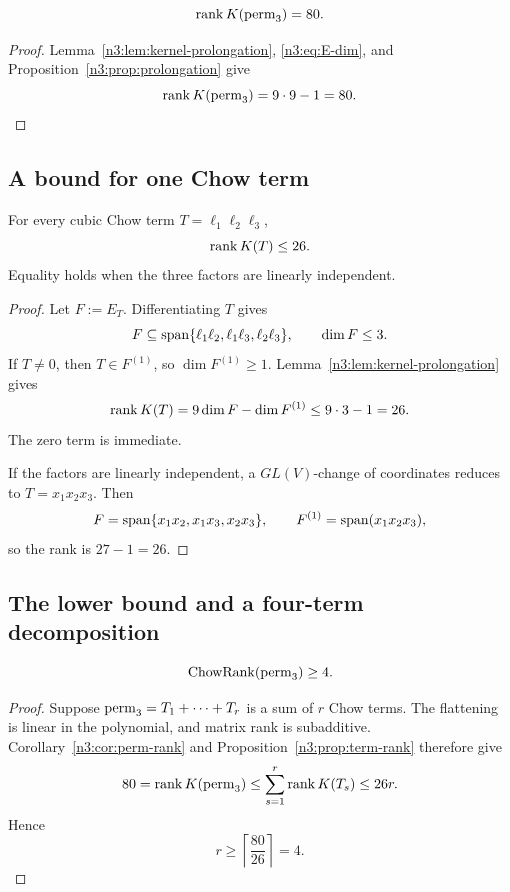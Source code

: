 \begin{corollary}\label{n3:cor:perm-rank}
\[
  \operatorname{rank} K(\operatorname{perm}_3)=80.
\]
\end{corollary}

\begin{proof}
Lemma~\ref{n3:lem:kernel-prolongation}, \eqref{n3:eq:E-dim}, and
Proposition~\ref{n3:prop:prolongation} give
\[
  \operatorname{rank} K(\operatorname{perm}_3)=9\cdot9-1=80.
\]
\end{proof}

\subsection{A bound for one Chow term}

\begin{proposition}\label{n3:prop:term-rank}
For every cubic Chow term \(T=\ell_1\ell_2\ell_3\),
\[
  \operatorname{rank} K(T)\leq26.
\]
Equality holds when the three factors are linearly independent.
\end{proposition}

\begin{proof}
Let \(F:=E_T\). Differentiating \(T\) gives
\[
  F\subseteq\operatorname{span}\{\ell_1\ell_2,\ell_1\ell_3,\ell_2\ell_3\},
  \qquad \dim F\leq3.
\]
If \(T\neq0\), then \(T\in F^{(1)}\), so \(\dim F^{(1)}\geq1\).
Lemma~\ref{n3:lem:kernel-prolongation} gives
\[
  \operatorname{rank} K(T)=9\dim F-\dim F^{(1)}\leq9\cdot3-1=26.
\]
The zero term is immediate.

If the factors are linearly independent, a \(GL(V)\)-change of coordinates
reduces to \(T=x_1x_2x_3\). Then
\[
  F=\operatorname{span}\{x_1x_2,x_1x_3,x_2x_3\},
  \qquad F^{(1)}=\operatorname{span}(x_1x_2x_3),
\]
so the rank is \(27-1=26\).
\end{proof}

\subsection{The lower bound and a four-term decomposition}

\begin{theorem}\label{n3:thm:lower}
\[
  \operatorname{ChowRank}(\operatorname{perm}_3)\geq4.
\]
\end{theorem}

\begin{proof}
Suppose \(\operatorname{perm}_3=T_1+\cdots+T_r\) is a sum of \(r\) Chow terms. The
flattening is linear in the polynomial, and matrix rank is subadditive.
Corollary~\ref{n3:cor:perm-rank} and Proposition~\ref{n3:prop:term-rank}
therefore give
\[
  80=\operatorname{rank} K(\operatorname{perm}_3)
  \leq\sum_{s=1}^{r}\operatorname{rank} K(T_s)\leq26r.
\]
Hence
\[
  r\geq\left\lceil\frac{80}{26}\right\rceil=4.
\]
\end{proof}

